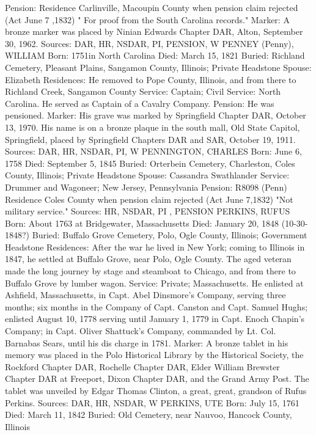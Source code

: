 Pension: Residence Carlinville, Macoupin County when pension claim rejected (Act June 7 ,1832) " For proof from the South Carolina records." 
Marker: A bronze marker was placed by Ninian Edwards Chapter DAR, Alton, September 30, 1962. 
Sources: DAR, HR, NSDAR, PI, PENSION, W 
PENNEY (Penny), WILLIAM 
Born: 1751in North Carolina
Died: March 15, 1821
Buried: Richland Cemetery, Pleasant Plains, Sangamon County, Illinois; Private 
Headstone 
Spouse: Elizabeth 
Residences: He removed to Pope County, Illinois, and from there to Richland Creek, Sangamon County
Service: Captain; Civil Service: North Carolina. He served as Captain of a Cavalry Company. 
Pension: He was pensioned.
Marker: His grave was marked by Springfield Chapter DAR, October 13, 1970.  His name is on a bronze plaque in the south mall, Old State Capitol, Spring­field, placed by Springfield Chapters DAR and SAR, October 19, 1911. 
Sources: DAR, HR, NSDAR, PI, W 
PENNINGTON, CHARLES
Born: June 6, 1758
Died: September 5, 1845
Buried: Orterbein Cemetery, Charleston, Coles County, Illinois; Private Headstone 
Spouse: Cassandra Swathlander
Service: Drummer and Wagoneer; New Jersey, Pennsylvania Pension: R8098 (Penn) Residence Coles County when pension claim rejected (Act June 7,1832) "Not military service." 
Sources: HR, NSDAR, PI , PENSION 
PERKINS, RUFUS 
Born: About 1763 at Bridgewater, Massachusetts 
Died: January 20, 1848 (10-30-1848?) 
Buried: Buffalo Grove Cemetery, Polo, Ogle County, Illinois; Government Headstone 
Residences: After the war he lived in New York; coming to Illinois in 1847, he settled at Buffalo Grove, near Polo, Ogle County. The aged veteran made the long journey by stage and steamboat to Chicago, and from there to Buffalo Grove by lumber wagon. 
Service: Private; Massachusetts. He enlisted at Ashfield, Massachusetts, in Capt. Abel Dinsmore's Company, serving three months; six months in the Company of Capt. Canston and Capt. Samuel Hughs; enlisted August 10, 1778 serving until January 1, 1779 in Capt. Enoch Chapin's Company; in Capt. Oliver Shattuck's Company, commanded by Lt. Col. Barnabas Sears, until his dis charge in 1781. 
Marker: A bronze tablet in his memory was placed in the Polo Historical Library by the Historical Society, the Rockford Chapter DAR, Rochelle Chapter DAR, Elder William Brewster Chapter DAR at Freeport, Dixon Chapter DAR, and the Grand Army Post. The tablet was unveiled by Edgar Thomas Clinton, a great, great, grandson of Rufus Perkins. 
Sources: DAR, HR, NSDAR, W 
PERKINS, UTE 
Born: July 15, 1761 
Died: March 11, 1842
Buried: Old Cemetery, near Nauvoo, Hancock County, Illinois 
